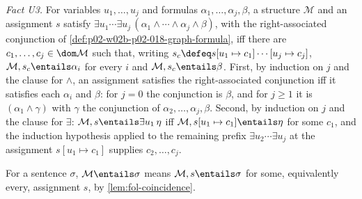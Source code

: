 \emph{Fact U3.}  For variables \(u_1,\ldots,u_j\) and formulas
\(\alpha_1,\ldots,\alpha_j,\beta\), a structure \(\mathcal M\) and an
assignment \(s\) satisfy
\(\exists u_1\cdots\exists u_j\,(\alpha_1\land\cdots\land\alpha_j\land\beta)\),
with the right-associated conjunction of
\cref{def:p02-w02b-p02-018-graph-formula}, iff there are
\(c_1,\ldots,c_j\in\dom\mathcal M\) such that, writing
\(s_c\defeq s[u_1\mapsto c_1]\cdots[u_j\mapsto c_j]\),
\(\mathcal M,s_c\entails\alpha_i\) for every \(i\) and
\(\mathcal M,s_c\entails\beta\).  First, by induction on \(j\) and the
clause for \(\land\), an assignment satisfies the right-associated
conjunction iff it satisfies each \(\alpha_i\) and \(\beta\): for \(j=0\) the
conjunction is \(\beta\), and for \(j\geq1\) it is
\((\alpha_1\land\gamma)\) with \(\gamma\) the conjunction of
\(\alpha_2,\ldots,\alpha_j,\beta\).  Second, by induction on \(j\) and the
clause for \(\exists\): \(\mathcal M,s\entails\exists u_1\,\eta\) iff
\(\mathcal M,s[u_1\mapsto c_1]\entails\eta\) for some \(c_1\), and the
induction hypothesis applied to the remaining prefix \(\exists u_2\cdots\exists u_j\)
at the assignment \(s[u_1\mapsto c_1]\) supplies \(c_2,\ldots,c_j\).

For a sentence \(\sigma\), \(\mathcal M\entails\sigma\) means
\(\mathcal M,s\entails\sigma\) for some, equivalently every, assignment
\(s\), by \cref{lem:fol-coincidence}.

